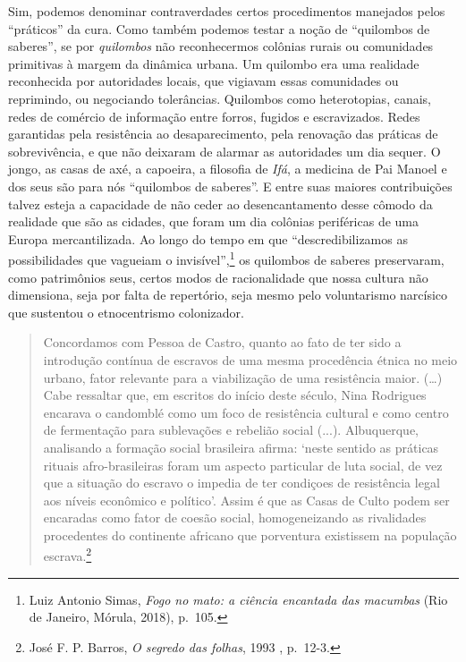 Sim, podemos denominar contraverdades certos procedimentos manejados
pelos ``práticos'' da cura. Como também podemos testar a noção de
``quilombos de saberes'', se por \emph{quilombos} não reconhecermos
colônias rurais ou comunidades primitivas à margem da dinâmica urbana.
Um quilombo era uma realidade reconhecida por autoridades locais, que
vigiavam essas comunidades ou reprimindo, ou negociando tolerâncias.
Quilombos como heterotopias, canais, redes de comércio de informação
entre forros, fugidos e escravizados. Redes garantidas pela resistência
ao desaparecimento, pela renovação das práticas de sobrevivência, e que
não deixaram de alarmar as autoridades um dia sequer. O jongo, as casas
de axé, a capoeira, a filosofia de \emph{Ifá}, a medicina de Pai Manoel
e dos seus são para nós ``quilombos de saberes''. E entre suas maiores
contribuições talvez esteja a capacidade de não ceder ao desencantamento
desse cômodo da realidade que são as cidades, que foram um dia colônias
periféricas de uma Europa mercantilizada. Ao longo do tempo em que
``descredibilizamos as possibilidades que vagueiam o
invisível'',\footnote{Luiz Antonio Simas, \emph{Fogo no mato: a ciência
  encantada das macumbas} (Rio de Janeiro, Mórula, 2018), p.~105.} os
quilombos de saberes preservaram, como patrimônios seus, certos modos de
racionalidade que nossa cultura não dimensiona, seja por falta de
repertório, seja mesmo pelo voluntarismo narcísico que sustentou o
etnocentrismo colonizador.

\begin{quote}
Concordamos com Pessoa de Castro, quanto ao fato de ter sido a
introdução contínua de escravos de uma mesma procedência étnica no meio
urbano, fator relevante para a viabilização de uma resistência maior.
(\ldots{}) Cabe ressaltar que, em escritos do início deste século, Nina
Rodrigues encarava o candomblé como um foco de resistência cultural e
como centro de fermentação para sublevações e rebelião social (...).
Albuquerque, analisando a formação social brasileira afirma: `neste
sentido as práticas rituais afro-brasileiras foram um aspecto particular
de luta social, de vez que a situação do escravo o impedia de ter
condiçoes de resistência legal aos níveis econômico e político'. Assim é
que as Casas de Culto podem ser encaradas como fator de coesão social,
homogeneizando as rivalidades procedentes do continente africano que
porventura existissem na população escrava.\footnote{José F. P. Barros,
  \emph{O segredo das folhas}, 1993 , p.~12-3.}
\end{quote}

